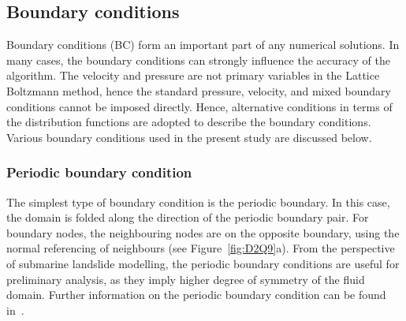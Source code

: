 \subsection{Boundary conditions}
Boundary conditions (BC) form an important part of any numerical solutions. In many cases, the boundary conditions can strongly influence the accuracy of the algorithm. The velocity and pressure are not primary variables in the Lattice Boltzmann method, hence the standard pressure, velocity, and mixed boundary conditions cannot be imposed directly. Hence, alternative conditions in terms of the distribution functions are adopted to describe the boundary conditions. Various boundary conditions used in the present study are discussed below.
\subsubsection*{Periodic boundary condition}
The simplest type of boundary condition is the periodic boundary. In this case, the domain is folded along the direction of the periodic boundary pair. For boundary nodes, the neighbouring nodes are on the opposite boundary, using the normal referencing of neighbours (see Figure~\ref{fig:D2Q9}a). From the perspective of submarine landslide modelling, the periodic boundary conditions are useful for preliminary analysis, as they imply higher degree of symmetry of the fluid domain. Further information on the periodic boundary condition can be found in~\citet{aidun1998}.
